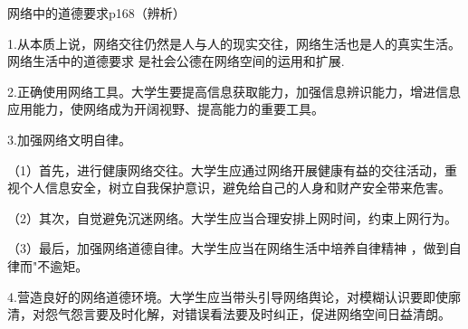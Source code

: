 \documentclass[lang=cn,10pt]{elegantbook}
\begin{document}
	\begin{example}
		网络中的道德要求p168（辨析）
	\end{example}
	\begin{solution}
		
		1.从本质上说，网络交往仍然是人与人的现实交往，网络生活也是人的真实生活。网络生活中的道德要求 是社会公德在网络空间的运用和扩展.
		
		2.正确使用网络工具。大学生要提高信息获取能力，加强信息辨识能力，增进信息应用能力，使网络成为开阔视野、提高能力的重要工具。
		
		3.加强网络文明自律。
		
		（1）首先，进行健康网络交往。大学生应通过网络开展健康有益的交往活动，重视个人信息安全，树立自我保护意识，避免给自己的人身和财产安全带来危害。
		
		（2）其次，自觉避免沉迷网络。大学生应当合理安排上网时间，约束上网行为。
		
		（3）最后，加强网络道德自律。大学生应当在网络生活中培养自律精神 ，做到自律而"不逾矩。
		
		4.营造良好的网络道德环境。大学生应当带头引导网络舆论，对模糊认识要即使廓清，对怨气怨言要及时化解，对错误看法要及时纠正，促进网络空间日益清朗。
	\end{solution}
\end{document}
